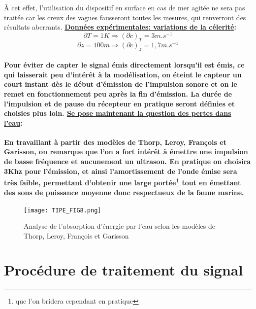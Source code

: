 \documentclass[a4paper,11pt]{article}
\begin{document}
{\`{A} cet effet, l'utilisation du dispositif en surface en cas de mer agit\'{e}e ne sera pas trait\'{e}e car les creux des vagues fausseront toutes les mesures, qui renverront des r\'{e}sultats aberrants. \newline \newline
\textbf{\underline{Donn\'{e}es exp\'{e}rimentales: variations de la c\'{e}lerit\'{e}}:}}
\[\partial T= 1K \Rightarrow (\partial c)_T=3m.s^{-1}\]
\[\partial z= 100m \Rightarrow (\partial c)_z=1,7m.s^{-1}\]
\paragraph{\normalfont Pour \'{e}viter de capter le signal \'{e}mis directement lorsqu'il est \'{e}mis, ce qui laisserait peu d'int\'{e}r\^{e}t \`{a} la mod\'{e}lisation, on \textbf{\'{e}teint le capteur un court instant d\`{e}s le d\'{e}but d'\'{e}mission de l'impulsion sonore et on le remet en fonctionnement peu apr\`{e}s la fin d'\'{e}mission}. La dur\'{e}e de l'impulsion et de pause du r\'{e}cepteur en pratique seront d\'{e}finies et choisies plus loin. \newline \newline
\textbf{\underline{Se pose maintenant la question des pertes dans l'eau}}:}
\paragraph{\normalfont En travaillant \`{a} partir des mod\`{e}les de Thorp, Leroy, Fran\c{c}ois et Garisson, on remarque que l'on a fort int\'{e}r\^{e}t \`{a} \'{e}mettre une impulsion de basse fr\'{e}quence et aucunement un ultrason. En pratique on choisira \textbf{3Khz pour l'\'{e}mission}, et ainsi l'amortissement de l'onde \'{e}mise sera tr\`{e}s faible, permettant d'obtenir une large port\'{e}e\protect\footnote{que l'on bridera cependant en pratique} tout en \'{e}mettant des sons de puissance moyenne donc respectueux de la faune marine.}
\begin{figure}[!h]
\texttt{[image: TIPE\_FIG8.png]}
\caption{Analyse de l'absorption d'\'{e}nergie par l'eau selon les mod\`{e}les de Thorp, Leroy, Fran\c{c}ois et Garisson}
\label{fig_8}
\end{figure}
\section{Proc\'{e}dure de traitement du signal}
\end{document}
